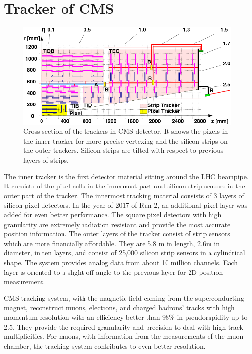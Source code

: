 \section{Tracker of CMS}
\begin{figure}[h!]
  \label{fig:tracker}
  \centering
  \includegraphics[width=0.9\linewidth]{figs/Tracker.png}
	\caption{Cross-section of the trackers in CMS detector. It shows the pixels in the inner tracker for more precise vertexing and the silicon strips on the outer trackers. Silicon strips are tilted with respect to previous layers of strips. \cite{trk}}
\end{figure}

The inner tracker is the first detector material sitting around the LHC beampipe.
It consists of the pixel cells in the innermost part and silicon strip sensors in the outer part of the tracker.
The innermost tracking material consists of 3 layers of silicon pixel detectors.
In the year of 2017 of Run 2, an additional pixel layer was added for even better performance.
The square pixel detectors with high granularity are extremely radiation resistant and provide the most accurate position information.
The outer layers of the tracker consist of strip sensors, which are more financially affordable.
They are 5.8 m in length, 2.6m in diameter, in ten layers, and consist of 25,000 silicon strip sensors in a cylindrical shape.
The system provides analog data from about 10 million channels.
Each layer is oriented to a slight off-angle to the previous layer for 2D position measurement.

CMS tracking system, with the magnetic field coming from the superconducting magnet, reconstruct muons, electrons, and charged hadrons' tracks with high momentum resolution with an efficiency better than 98\% in pseudorapidity up to 2.5.
They provide the required granularity and precision to deal with high-track multiplicities.
For muons, with information from the measurements of the muon chamber, the tracking system contributes to even better resolution.

